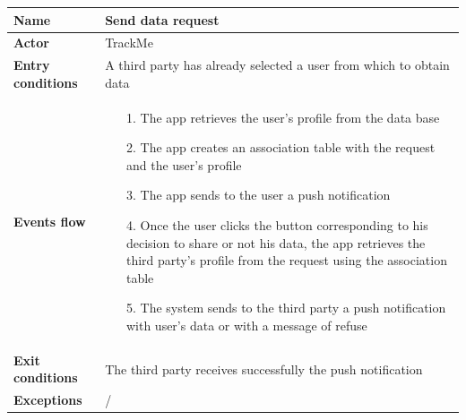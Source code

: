 \begin{table}[]
\begin{adjustbox}{width=\textwidth}
\footnotesize
\begin{tabular}{|p{}|p{}|}
\hline
\textbf{Name}             &  Send data request\\ \hline
\textbf{Actor}            &  TrackMe\\ \hline
\textbf{Entry conditions} &  A third party has already selected a user from which to obtain data\\ \hline
\textbf{Events flow}      &
	\begin{itemize}
		\item[1.] The app retrieves the user's profile from the data base
		\item[2.] The app creates an association table with the request and the user's profile
		\item[3.] The app sends to the user a push notification
		\item[4.] Once the user clicks the button corresponding to his decision to share or not his data, the app retrieves the third party's profile from the request using the association table
		\item[5.] The system sends to the third party a push notification with user's data or with a message of refuse
	\end{itemize}\\ \hline
\textbf{Exit conditions}  &  The third party receives successfully the push notification\\ \hline
\textbf{Exceptions}       &  /\\ \hline
\end{tabular}
\end{adjustbox}
\end{table}

